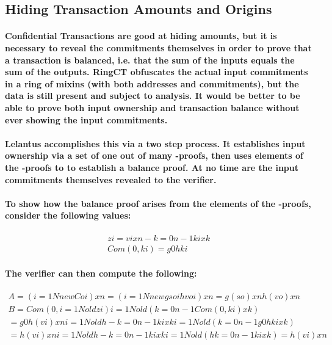 \documentclass{article}
\begin{document}
\subsection{Hiding Transaction Amounts and Origins}
 
\paragraph{Confidential Transactions are good at hiding amounts, but it is necessary to reveal the commitments themselves in order to prove that a transaction is balanced, i.e. that the sum of the inputs equals the sum of the outputs.  RingCT obfuscates the actual input commitments in a ring of mixins (with both addresses and commitments), but the data is still present and subject to analysis.  It would be better to be able to prove both input ownership and transaction balance without ever showing the input commitments.}

\paragraph{Lelantus accomplishes this via a two step process.  It establishes input ownership via a set of one out of many -proofs, then uses elements of the -proofs to to establish a balance proof.  At no time are the input commitments themselves revealed to the verifier.}

\paragraph{To show how the balance proof arises from the elements of the -proofs, consider the following values:}

\begin{eqnarray}
  zi=vixn-k=0n-1kixk\\
  Com(0,ki)=g0hki
\end{eqnarray}

\paragraph{The verifier can then compute the following:}

\begin{eqnarray}
  A=(i=1NnewCoi)xn=(i=1Nnewgsoihvoi)xn=g( so) xnh( vo) xn\\
  B=Com(0,i=1Noldzi) i=1Nold(k=0n-1Com(0,ki)xk)\\
  =g0h( vi) xn i=1Noldh-k=0n-1kixki=1Nold(k=0n-1g0hkixk)\\
  =h( vi) xn i=1Noldh-k=0n-1kixki=1Nold(hk=0n-1kixk)=h( vi) xn
\end{eqnarray}
\end{document}
